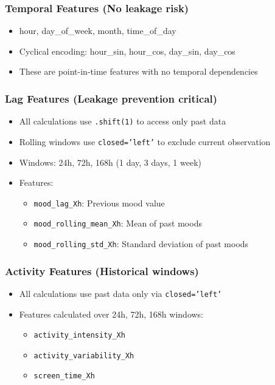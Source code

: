 \documentclass{article}
\begin{document}
\subsubsection{Temporal Features (No leakage risk)}
\begin{itemize}[noitemsep]
\item hour, day\_of\_week, month, time\_of\_day
\item Cyclical encoding: hour\_sin, hour\_cos, day\_sin, day\_cos
\item These are point-in-time features with no temporal dependencies
\end{itemize}

\subsubsection{Lag Features (Leakage prevention critical)}
\begin{itemize}[noitemsep]
\item All calculations use \texttt{.shift(1)} to access only past data
\item Rolling windows use \texttt{closed='left'} to exclude current observation
\item Windows: 24h, 72h, 168h (1 day, 3 days, 1 week)
\item Features:
  \begin{itemize}[noitemsep]
  \item \texttt{mood\_lag\_Xh}: Previous mood value
  \item \texttt{mood\_rolling\_mean\_Xh}: Mean of past moods
  \item \texttt{mood\_rolling\_std\_Xh}: Standard deviation of past moods
  \end{itemize}
\end{itemize}

\subsubsection{Activity Features (Historical windows)}
\begin{itemize}[noitemsep]
\item All calculations use past data only via \texttt{closed='left'}
\item Features calculated over 24h, 72h, 168h windows:
  \begin{itemize}[noitemsep]
  \item \texttt{activity\_intensity\_Xh}
  \item \texttt{activity\_variability\_Xh}
  \item \texttt{screen\_time\_Xh}
  \end{itemize}
\end{itemize}
\end{document}
